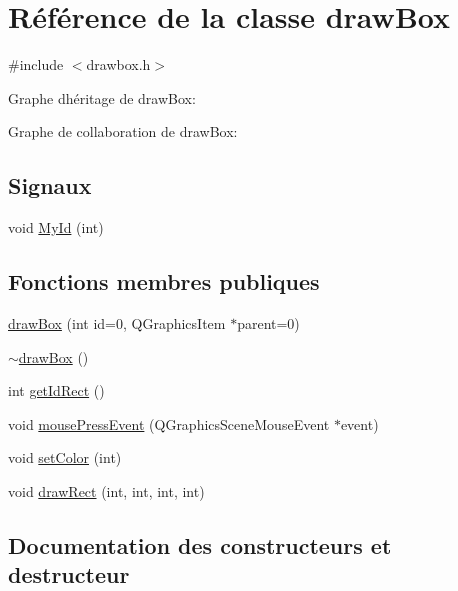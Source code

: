 \hypertarget{classdraw_box}{}\section{Référence de la classe draw\+Box}
\label{classdraw_box}


{\ttfamily \#include $<$drawbox.\+h$>$}



Graphe d\textquotesingle{}héritage de draw\+Box\+:


Graphe de collaboration de draw\+Box\+:
\subsection*{Signaux}
\begin{DoxyCompactItemize}
\item 
void \hyperlink{classdraw_box_a4f07245bd958a7ccfd18ca5343f26519}{My\+Id} (int)
\end{DoxyCompactItemize}
\subsection*{Fonctions membres publiques}
\begin{DoxyCompactItemize}
\item 
\hyperlink{classdraw_box_ab962b4b7fa0dd7bd00e18ab64fdba12c}{draw\+Box} (int id=0, Q\+Graphics\+Item $\ast$parent=0)
\item 
\hyperlink{classdraw_box_aa351e71f438df71396f72eb4c636ab4e}{$\sim$draw\+Box} ()
\item 
int \hyperlink{classdraw_box_a1e94400d4a52e328f84813438883ad17}{get\+Id\+Rect} ()
\item 
void \hyperlink{classdraw_box_a46020cd59dba2e55045db9aeb357ff00}{mouse\+Press\+Event} (Q\+Graphics\+Scene\+Mouse\+Event $\ast$event)
\item 
void \hyperlink{classdraw_box_a560ea9e1901367a1bfb3cba38201261a}{set\+Color} (int)
\item 
void \hyperlink{classdraw_box_a8755c23a415501bcce1f2bbda171e44b}{draw\+Rect} (int, int, int, int)
\end{DoxyCompactItemize}


\subsection{Documentation des constructeurs et destructeur}
\hypertarget{classdraw_box_ab962b4b7fa0dd7bd00e18ab64fdba12c}{}
